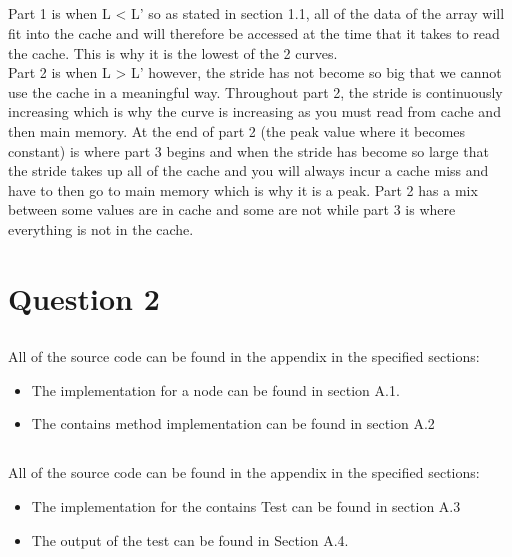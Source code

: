 \documentclass[11pt]{article}
\begin{document}
\subsection{}
Part 1 is when L < L' so as stated in section 1.1, all of the data of the array will fit into the cache and will therefore be accessed at 
the time that it takes to read the cache. This is why it is the lowest of the 2 curves. \\
Part 2 is when L > L' however, the stride has not become so big that we cannot use the cache in a meaningful way. Throughout part 2, the 
stride is continuously increasing which is why the curve is increasing as you must read from cache and then main memory. At the end of 
part 2 (the peak value where it becomes constant) is where part 3 begins and when the stride has become so large that the stride takes 
up all of the cache and you will always incur a cache miss and have to then go to main memory which is why it is a peak. Part 2 has a mix 
between some values are in cache and some are not while part 3 is where everything is not in the cache. 

\subsection{}

\section{Question 2}

\subsection{}
All of the source code can be found in the appendix in the specified sections:
\begin{itemize}
	\item The implementation for a node can be found in section A.1. 
	\item The contains method implementation can be found in section A.2 
\end{itemize}

\subsection{}
All of the source code can be found in the appendix in the specified sections:
\begin{itemize}
	\item The implementation for the contains Test can be found in section A.3
	\item The output of the test can be found in Section A.4.
\end{itemize}
\end{document}
